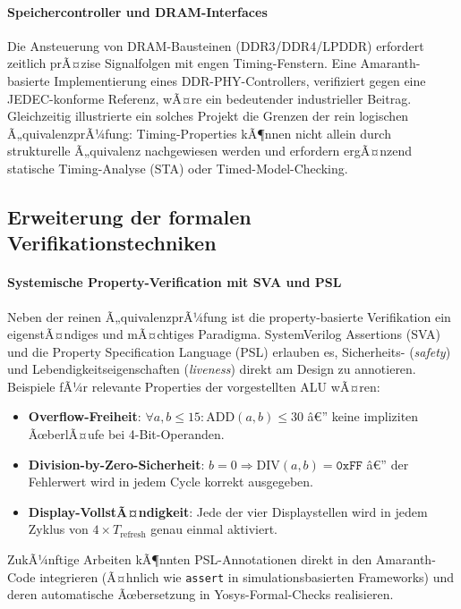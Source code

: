 ﻿\documentclass[12pt,a4paper]{report}
\begin{document}
\paragraph{Speichercontroller und DRAM-Interfaces}
Die Ansteuerung von DRAM-Bausteinen (DDR3/DDR4/LPDDR) erfordert zeitlich prÃ¤zise
Signalfolgen mit engen Timing-Fenstern. Eine Amaranth-basierte Implementierung eines
DDR-PHY-Controllers, verifiziert gegen eine JEDEC-konforme Referenz, wÃ¤re ein
bedeutender industrieller Beitrag. Gleichzeitig illustrierte ein solches Projekt die
Grenzen der rein logischen Ã„quivalenzprÃ¼fung: Timing-Properties kÃ¶nnen nicht allein durch
strukturelle Ã„quivalenz nachgewiesen werden und erfordern ergÃ¤nzend statische
Timing-Analyse (STA) oder Timed-Model-Checking.

\subsection{Erweiterung der formalen Verifikationstechniken}

\paragraph{Systemische Property-Verification mit SVA und PSL}
Neben der reinen Ã„quivalenz\-prÃ¼fung ist die property-basierte Verifikation ein
eigenstÃ¤ndiges und mÃ¤chtiges Paradigma. SystemVerilog Assertions (SVA) und die
Property Specification Language (PSL) erlauben es, Sicherheits- (\textit{safety}) und
Lebendigkeitseigenschaften (\textit{liveness}) direkt am Design zu annotieren. Beispiele
fÃ¼r relevante Properties der vorgestellten ALU wÃ¤ren:

\begin{itemize}
  \item \textbf{Overflow-Freiheit}: $\forall a, b \leq 15 : \text{ADD}(a, b) \leq 30$
        â€” keine impliziten ÃœberlÃ¤ufe bei 4-Bit-Operanden.
  \item \textbf{Division-by-Zero-Sicherheit}: $b = 0 \Rightarrow \text{DIV}(a, b) = \texttt{0xFF}$
        â€” der Fehlerwert wird in jedem Cycle korrekt ausgegeben.
  \item \textbf{Display-VollstÃ¤ndigkeit}: Jede der vier Displaystellen wird in jedem
        Zyklus von $4 \times T_{\mathrm{refresh}}$ genau einmal aktiviert.
\end{itemize}

ZukÃ¼nftige Arbeiten kÃ¶nnten PSL-Annotationen direkt in den Amaranth-Code integrieren
(Ã¤hnlich wie \texttt{assert} in simulationsbasierten Frameworks) und deren automatische
Ãœbersetzung in Yosys-Formal-Checks realisieren.
\end{document}
